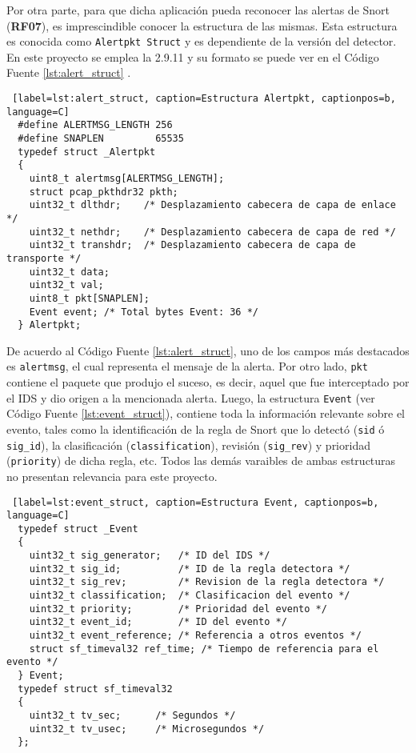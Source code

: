Por otra parte, para que dicha aplicación pueda reconocer las alertas de Snort
(\textbf{RF07}), es imprescindible conocer la estructura de las mismas. Esta
estructura es conocida como \verb|Alertpkt Struct| y es dependiente de la
versión del detector. En este proyecto se emplea la 2.9.11 y su formato se puede
ver en el Código Fuente \ref{lst:alert_struct} \parencite{alerpkt}.

\begin{lstlisting} [label=lst:alert_struct, caption=Estructura Alertpkt, captionpos=b, language=C]
  #define ALERTMSG_LENGTH 256
  #define SNAPLEN         65535 
  typedef struct _Alertpkt
  {
    uint8_t alertmsg[ALERTMSG_LENGTH];
    struct pcap_pkthdr32 pkth;
    uint32_t dlthdr;    /* Desplazamiento cabecera de capa de enlace */
    uint32_t nethdr;    /* Desplazamiento cabecera de capa de red */
    uint32_t transhdr;  /* Desplazamiento cabecera de capa de transporte */
    uint32_t data;
    uint32_t val;
    uint8_t pkt[SNAPLEN];
    Event event; /* Total bytes Event: 36 */
  } Alertpkt;
\end{lstlisting}

De acuerdo al Código Fuente \ref{lst:alert_struct}, uno de los campos más
destacados es \verb|alertmsg|, el cual representa el mensaje de la alerta. Por
otro lado, \verb|pkt| contiene el paquete que produjo el suceso, es decir, aquel
que fue interceptado por el IDS y dio origen a la mencionada alerta. Luego, la
estructura \verb|Event| (ver Código Fuente \ref{lst:event_struct}), contiene
toda la información relevante sobre el evento, tales como la identificación de
la regla de Snort que lo detectó (\verb|sid| ó \verb|sig_id|), la clasificación
(\verb|classification|), revisión (\verb|sig_rev|) y prioridad (\verb|priority|)
de dicha regla, etc. Todos las demás varaibles de ambas estructuras no presentan
relevancia para este proyecto.

\begin{lstlisting} [label=lst:event_struct, caption=Estructura Event, captionpos=b, language=C]
  typedef struct _Event
  {
    uint32_t sig_generator;   /* ID del IDS */
    uint32_t sig_id;          /* ID de la regla detectora */
    uint32_t sig_rev;         /* Revision de la regla detectora */
    uint32_t classification;  /* Clasificacion del evento */
    uint32_t priority;        /* Prioridad del evento */
    uint32_t event_id;        /* ID del evento */
    uint32_t event_reference; /* Referencia a otros eventos */
    struct sf_timeval32 ref_time; /* Tiempo de referencia para el evento */
  } Event;
  typedef struct sf_timeval32
  {
    uint32_t tv_sec;      /* Segundos */
    uint32_t tv_usec;     /* Microsegundos */
  };
\end{lstlisting}

